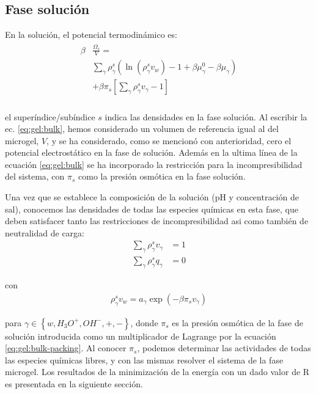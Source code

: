 \subsection{Fase soluci\'on}\label{sec:gel:fase-solucion}

En la soluci\'on, el potencial termodin\'amico es:
%
%
\begin{align}
\begin{aligned}
\beta&\frac{\Omega_s}{V}=\\& \sum_{\gamma   } {\rho^s_\gamma\left(\ln(\rho_\gamma^sv_w) -1 + \beta\mu_\gamma^0 - \beta\mu_\gamma\right)} \\
& +\beta\pi_{s} \left[ \sum_{\gamma } \rho^s_\gamma v_\gamma  -1 \right] \\
\end{aligned}
\label{eq:gel:bulk}
\end{align}

\noindent el super\'indice/sub\'indice  $s$  indica las densidades en la fase soluci\'on.
Al escribir la ec. \ref{eq:gel:bulk}, hemos considerado un volumen de referencia igual al del microgel, $V$, y se ha considerado, como se mencion\'o con anterioridad, cero el potencial electrost\'atico en la fase de soluci\'on.
Adem\'as en la ultima l\'inea de la ecuaci\'on \ref{eq:gel:bulk} se ha incorporado la restricci\'on para la incompresibilidad del sistema, con $\pi_s$ como la presi\'on osm\'otica en la fase soluci\'on.

Una vez que se establece la composici\'on de la soluci\'on (pH y concentraci\'on de sal), conocemos las densidades de todas las especies qu\'imicas en esta fase, que deben satisfacer tanto las restricciones de incompresibilidad asi como tambi\'en  de neutralidad de carga:
%
%
\begin{align}
\sum_{\gamma  } \rho_\gamma^s v_\gamma  &=1\label{eq:gel:bulk-packing}\\
\sum_{\gamma  } \rho_\gamma^s q_\gamma  &=0 \label{eq:gel:bulk-neutralidad}
\end{align}

\noindent con
%
%
\begin{align}
\rho_\gamma^s v_w= a_\gamma \exp(-\beta\pi_s v_\gamma)
\label{eq:gel:bulk-electroneutrality}
\end{align}



\noindent para $\gamma \in \left\{ w, H_3O^+, OH^-, +,- \right\}$, donde $\pi_s$ es la presi\'on osm\'otica de la fase de soluci\'on introducida como un multiplicador de Lagrange por la ecuaci\'on \ref{eq:gel:bulk-packing}.
Al conocer $\pi_s$, podemos determinar las actividades de todas las especies qu\'imicas libres, y con las mismas resolver el sistema de la fase microgel.
Los resultados de la minimizaci\'on de la energ\'ia con un dado valor de R es presentada en la siguiente secci\'on.

